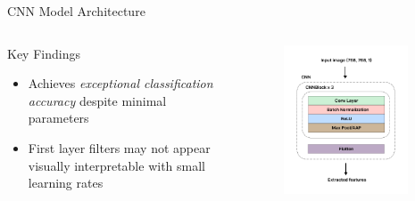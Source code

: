 \documentclass[aspectratio=169,8pt]{beamer}  %
\begin{document}
\begin{frame}{CNN Model Architecture}
\begin{columns}[T]
\begin{column}{0.6\textwidth}
\begin{alertblock}{Key Findings}
\begin{itemize}
\item Achieves \emph{exceptional classification accuracy} despite minimal parameters
\item First layer filters may not appear visually interpretable with small learning rates
\end{itemize}
\end{alertblock}
\end{column}
\begin{column}{0.4\textwidth}
\begin{figure}
\includegraphics[width=0.9\textwidth]{imgs/cnn_arch.png}
\end{figure}
\end{column}
\end{columns}
\end{frame}
\end{document}
